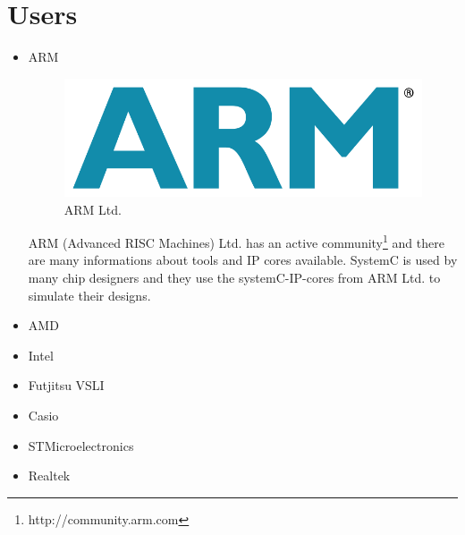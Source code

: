 \documentclass{article}
\begin{document}
	\section{Users}
	  \begin{itemize}
	  \item{ARM}
	      \begin{figure}[hp]
		\centering
		\includegraphics[scale=0.18]{../pictures/armlogo.jpg}
		\caption{ARM Ltd.}
		\label{fig:arm}
	      \end{figure}  
	      ARM (Advanced RISC Machines) Ltd. has an active community\footnote{http://community.arm.com} and there are many informations about tools and IP cores available.
	      SystemC is used by many chip designers and they use the systemC-IP-cores from ARM Ltd. to simulate their designs.
	   \item{AMD}
	   \item{Intel}	    
	   \item{Futjitsu VSLI}	    
	   \item{Casio}	    
	   \item{STMicroelectronics}
	   \item{Realtek}
	  \end{itemize}
\nocite{haubelt2010digitale}


\end{document}
